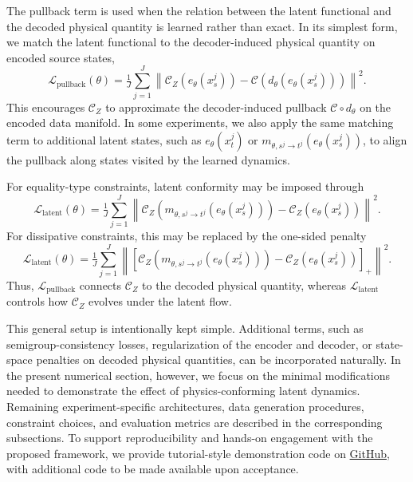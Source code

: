 \documentclass[a4paper,fleqn]{cas-sc}
\theoremstyle{thmstyleone}%
\theoremstyle{thmstyletwo}%
\theoremstyle{thmstylethree}%
\begin{document}
The pullback term is used when the relation between the latent functional and the decoded physical quantity is learned rather than exact. In its simplest form, we match the latent functional to the decoder-induced physical quantity on encoded source states,
\begin{equation}\label{eq:pullback-loss}
    \mathcal L_{\mathrm{pullback}}(\theta) = \tfrac{1}{J} \sum_{j=1}^J \left\| \mathcal C_Z(e_\theta(x_s^j)) - \mathcal C(d_\theta(e_\theta(x_s^j))) \right\|^2 .
\end{equation}
This encourages $\mathcal C_Z$ to approximate the decoder-induced pullback $\mathcal C\circ d_\theta$ on the encoded data manifold. In some experiments, we also apply the same matching term to additional latent states, such as $e_\theta(x_t^j)$ or $m_{\theta,s^j\to t^j}(e_\theta(x_s^j))$, to align the pullback along states visited by the learned dynamics.

For equality-type constraints, latent conformity may be imposed through
\begin{equation} \label{eq:latent-conformity-loss}
    \mathcal L_{\mathrm{latent}}(\theta) = \tfrac{1}{J} \sum_{j=1}^J \left\| \mathcal C_Z\left( m_{\theta,s^j\to t^j}(e_\theta(x_s^j)) \right) - \mathcal C_Z(e_\theta(x_s^j)) \right\|^2.
\end{equation}
For dissipative constraints, this may be replaced by the one-sided penalty
\begin{equation}\label{eq:latent-conformity-loss-ineq}
    \mathcal L_{\mathrm{latent}}(\theta) = \tfrac{1}{J} \sum_{j=1}^J \left\| \left[ \mathcal C_Z\left( m_{\theta,s^j\to t^j}(e_\theta(x_s^j)) \right) - \mathcal C_Z(e_\theta(x_s^j)) \right]_+ \right\|^2 .
\end{equation}
Thus, $\mathcal L_{\mathrm{pullback}}$ connects $\mathcal C_Z$ to the decoded physical quantity, whereas $\mathcal L_{\mathrm{latent}}$ controls how $\mathcal C_Z$ evolves under the latent flow.

This general setup is intentionally kept simple. Additional terms, such as semigroup-consistency losses, regularization of the encoder and decoder, or state-space penalties on decoded physical quantities, can be incorporated naturally. In the present numerical section, however, we focus on the minimal modifications needed to demonstrate the effect of physics-conforming latent dynamics. Remaining experiment-specific architectures, data generation procedures, constraint choices, and evaluation metrics are described in the corresponding subsections. To support reproducibility and hands-on engagement with the proposed framework, we provide tutorial-style demonstration code on \href{https://github.com/matthiaschung/physics-conforming-latent-twins}{GitHub}, with additional code to be made available upon acceptance.
\end{document}

